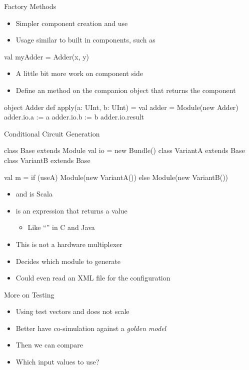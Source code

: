 \begin{frame}[fragile]{Factory Methods}
\begin{itemize}
\item Simpler component creation and use
\item Usage similar to built in components, such as 
\end{itemize}
\begin{chisel}
val myAdder = Adder(x, y)
\end{chisel}
\begin{itemize}
\item A little bit more work on component side
\item Define an  method on the companion object that returns the component
\end{itemize}
\begin{chisel}
object Adder {
  def apply(a: UInt, b: UInt) = {
    val adder = Module(new Adder)
    adder.io.a := a
    adder.io.b := b
    adder.io.result
  }
}
\end{chisel}
\end{frame}


\begin{frame}[fragile]{Conditional Circuit Generation}
\begin{chisel}
class Base extends Module { val io = new Bundle() }
class VariantA extends Base { }
class VariantB extends Base { }

val m = if (useA) Module(new VariantA())
        else Module(new VariantB())
\end{chisel}
\begin{itemize}
\item {} and  is Scala
\item {} is an expression that returns a value
\begin{itemize}
\item Like ``'' in C and Java
\end{itemize}
\item This is not a hardware multiplexer
\item Decides which module to generate
\item Could even read an XML file for the configuration
\end{itemize}
\end{frame}


\begin{frame}[fragile]{More on Testing}
\begin{itemize}
\item Using test vectors and  does not scale
\item Better have co-simulation against a \emph{golden model}
\item Then we can compare
\item Which input values to use?
\end{itemize}
\end{frame}

